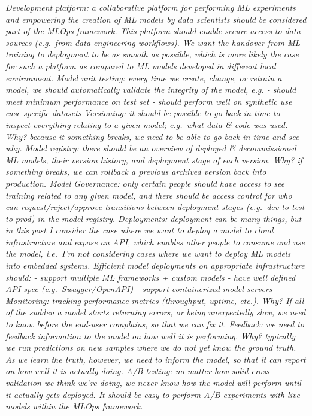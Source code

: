 \documentclass[
  11pt,
]{book}
\begin{document}
\emph{Development platform: a collaborative platform for performing ML experiments and empowering the creation of ML models by data scientists should be considered part of the MLOps framework. This platform should enable secure access to data sources (e.g.~from data engineering workflows). We want the handover from ML training to deployment to be as smooth as possible, which is more likely the case for such a platform as compared to ML models developed in different local environment.
Model unit testing: every time we create, change, or retrain a model, we should automatically validate the integrity of the model, e.g.
- should meet minimum performance on test set
- should perform well on synthetic use case-specific datasets
Versioning: it should be possible to go back in time to inspect everything relating to a given model; e.g.~what data \& code was used. Why? because it something breaks, we need to be able to go back in time and see why.
Model registry: there should be an overview of deployed \& decommissioned ML models, their version history, and deployment stage of each version. Why? if something breaks, we can rollback a previous archived version back into production.
Model Governance: only certain people should have access to see training related to any given model, and there should be access control for who can request/reject/approve transitions between deployment stages (e.g.~dev to test to prod) in the model registry.
Deployments: deployment can be many things, but in this post I consider the case where we want to deploy a model to cloud infrastructure and expose an API, which enables other people to consume and use the model, i.e.~I'm not considering cases where we want to deploy ML models into embedded systems. Efficient model deployments on appropriate infrastructure should:
- support multiple ML frameworks + custom models
- have well defined API spec (e.g.~Swagger/OpenAPI)
- support containerized model servers
Monitoring: tracking performance metrics (throughput, uptime, etc.). Why? If all of the sudden a model starts returning errors, or being unexpectedly slow, we need to know before the end-user complains, so that we can fix it.
Feedback: we need to feedback information to the model on how well it is performing. Why? typically we run predictions on new samples where we do not yet know the ground truth. As we learn the truth, however, we need to inform the model, so that it can report on how well it is actually doing.
A/B testing: no matter how solid cross-validation we think we're doing, we never know how the model will perform until it actually gets deployed. It should be easy to perform A/B experiments with live models within the MLOps framework.
}
\end{document}
